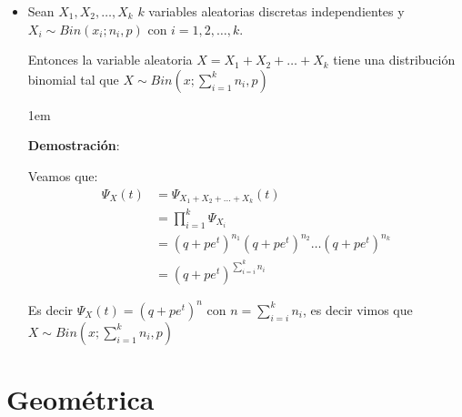 \documentclass[12pt, fleqn]{report}                             %
\newenvironment{SmallIndentation}[1][0.75em]                    %
        {\begin{adjustwidth}{#1}{}\begin{footnotesize}}             %
        {\end{footnotesize}\end{adjustwidth}}                       %
\theoremstyle{break}                                            %
\newcommand{\Wrap}[1]{\left( #1 \right)}                        %
\begin{document}
                \begin{itemize}
                    
                    \item 
                        Sean $X_1, X_2, \dots, X_k$ $k$ variables aleatorias discretas independientes
                        y $X_i \sim Bin(x_i; n_i, p)$ con $i = 1, 2, \dots, k$.

                        Entonces la variable aleatoria $X = X_1 + X_2 + \dots + X_k$ tiene una 
                        distribución binomial tal que $X \sim Bin\Wrap{x; \sum_{i=1}^k n_i, p}$ 

                        \begin{SmallIndentation}[1em]
                            \textbf{Demostración}:
                            
                            Veamos que:
                            \begin{align*}
                                \Psi_X(t)
                                    &= \Psi_{X_1 + X_2 + \dots + X_k}(t)                        \\
                                    &= \prod_{i=1}^k \Psi_{X_i}                                 \\
                                    &= (q +pe^t)^{n_1}(q +pe^t)^{n_2} \dots (q +pe^t)^{n_k}     \\
                                    &= (q +pe^t)^{\sum_{i=i}^k n_i}
                            \end{align*}

                            Es decir $\Psi_X(t) = (q +pe^t)^n$ con $n = \sum_{i=i}^k n_i$, es decir
                            vimos que $X \sim Bin\Wrap{x; \sum_{i=1}^k n_i, p}$
                            
                        
                        \end{SmallIndentation}


                \end{itemize}


        \clearpage
        \section{Geométrica}
\end{document}
